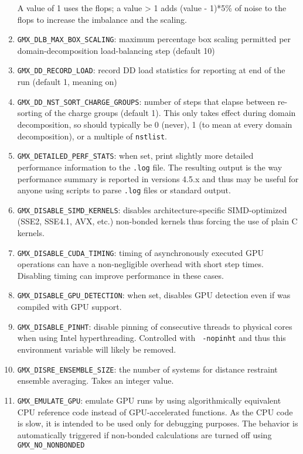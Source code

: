 \begin{enumerate}
        A value of 1 uses the flops; a value > 1 adds (value - 1)*5\% of noise to the flops to increase the imbalance and the scaling.
\item   {\tt GMX_DLB_MAX_BOX_SCALING}: maximum percentage box scaling permitted per domain-decomposition
        load-balancing step (default 10)
\item   {\tt GMX_DD_RECORD_LOAD}: record DD load statistics for reporting at end of the run (default 1, meaning on)
\item   {\tt GMX_DD_NST_SORT_CHARGE_GROUPS}: number of steps that elapse between re-sorting of the charge
        groups (default 1). This only takes effect during domain decomposition, so should typically
        be 0 (never), 1 (to mean at every domain decomposition), or a multiple of {\tt nstlist}.
\item   {\tt GMX_DETAILED_PERF_STATS}: when set, print slightly more detailed performance information
        to the {\tt .log} file. The resulting output is the way performance summary is reported in versions
        4.5.x and thus may be useful for anyone using scripts to parse {\tt .log} files or standard output.
\item   {\tt GMX_DISABLE_SIMD_KERNELS}: disables architecture-specific SIMD-optimized (SSE2, SSE4.1, AVX, etc.)
        non-bonded kernels thus forcing the use of plain C kernels.
\item   {\tt GMX_DISABLE_CUDA_TIMING}: timing of asynchronously executed GPU operations can have a
        non-negligible overhead with short step times. Disabling timing can improve performance in these cases.
\item   {\tt GMX_DISABLE_GPU_DETECTION}: when set, disables GPU detection even if {\tt {}} was compiled
        with GPU support.
\item   {\tt GMX_DISABLE_PINHT}: disable pinning of consecutive threads to physical cores when using
        Intel hyperthreading. Controlled with {\tt {} -nopinht} and thus this environment
        variable will likely be removed.
\item   {\tt GMX_DISRE_ENSEMBLE_SIZE}: the number of systems for distance restraint ensemble
        averaging. Takes an integer value.
\item   {\tt GMX_EMULATE_GPU}: emulate GPU runs by using algorithmically equivalent CPU reference code instead of
        GPU-accelerated functions. As the CPU code is slow, it is intended to be used only for debugging purposes.
        The behavior is automatically triggered if non-bonded calculations are turned off using {\tt GMX_NO_NONBONDED}

\end{enumerate}
